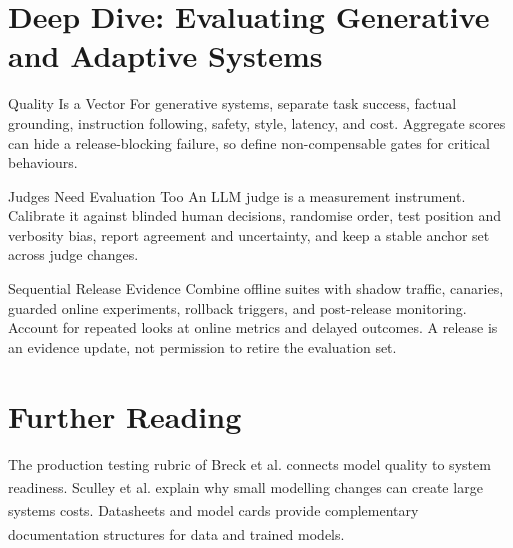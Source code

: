 \section{Deep Dive: Evaluating Generative and Adaptive Systems}
\begin{v3topic}{Quality Is a Vector}
For generative systems, separate task success, factual grounding, instruction
following, safety, style, latency, and cost.
Aggregate scores can hide a release-blocking failure, so define non-compensable
gates for critical behaviours.

\end{v3topic}
\begin{v3topic}{Judges Need Evaluation Too}
An LLM judge is a measurement instrument.
Calibrate it against blinded human decisions, randomise order, test position
and verbosity bias, report agreement and uncertainty, and keep a stable anchor
set across judge changes.

\end{v3topic}
\begin{v3topic}{Sequential Release Evidence}
Combine offline suites with shadow traffic, canaries, guarded online
experiments, rollback triggers, and post-release monitoring.
Account for repeated looks at online metrics and delayed outcomes.
A release is an evidence update, not permission to retire the evaluation set.
\end{v3topic}


\section{Further Reading}

The production testing rubric of Breck et al. connects model quality to system
readiness.\textsuperscript{\cite{breckMLTestScore2017}}
Sculley et al. explain why small modelling changes can create large systems
costs.\textsuperscript{\cite{sculleyHiddenTechnicalDebt2015}}
Datasheets and model cards provide complementary documentation structures for
data and trained
models.\textsuperscript{\cite{gebruDatasheetsDatasets2021,
mitchellModelCardsModel2019}}
